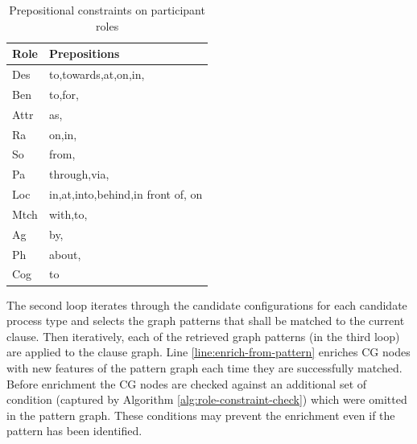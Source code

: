 \begin{table}[]
	\centering
	\begin{tabular}{|l|l|}
		\hline
		\textbf{Role} & \textbf{Prepositions}             \\ \hline
		Des           & to,towards,at,on,in,              \\ \hline
		Ben           & to,for,                           \\ \hline
		Attr          & as,                               \\ \hline
		Ra            & on,in,                            \\ \hline
		So            & from,                             \\ \hline
		Pa            & through,via,                      \\ \hline
		Loc           & in,at,into,behind,in front of, on \\ \hline
		Mtch          & with,to,                          \\ \hline
		Ag            & by,                               \\ \hline
		Ph            & about,                            \\ \hline
		Cog           & to                                \\ \hline
	\end{tabular}
	\caption{Prepositional constraints on participant roles }
	\label{tab:participant-roles-constraints}
\end{table}


The second loop iterates through the candidate configurations for each candidate process type and selects the graph patterns that shall be matched to the current clause. Then iteratively, each of the retrieved graph patterns (in the third loop) are applied to the clause graph. Line \ref{line:enrich-from-pattern} enriches CG nodes with new features of the pattern graph each time they are successfully matched. 
Before enrichment the CG nodes are checked against an additional set of condition (captured by Algorithm \ref{alg:role-constraint-check}) which were omitted in the pattern graph. These conditions may prevent the enrichment even if the pattern has been identified. 


